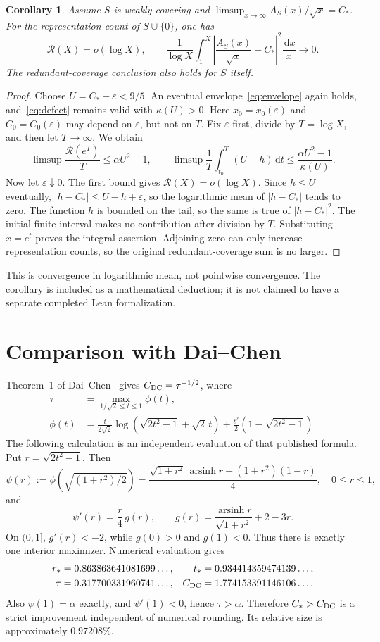 \documentclass[11pt]{article}
\newtheorem{corollary}[theorem]{Corollary}
\theoremstyle{definition}\newtheorem{definition}[theorem]{Definition}
\theoremstyle{remark}\newtheorem{remark}[theorem]{Remark}
\numberwithin{equation}{section}
\newcommand{\al}{\alpha}
\newcommand{\Cs}{C_*}
\newcommand{\RR}{\mathcal R}
\newcommand{\dd}{\,\mathrm d}
\DeclareMathOperator{\arsinh}{arsinh}
\begin{document}
\begin{corollary}\label{cor:rigidity}
Assume $S$ is weakly covering and
$\limsup_{x\to\infty}A_S(x)/\sqrt x=\Cs$.
For the representation count of $S\cup\{0\}$, one has
\[
\RR(X)=o(\log X),
\qquad
\frac1{\log X}\int_1^X
\left|\frac{A_S(x)}{\sqrt x}-\Cs\right|^2\frac{\dd x}{x}\longrightarrow0.
\]
The redundant-coverage conclusion also holds for $S$ itself.
\end{corollary}
\begin{proof}
Choose $U=\Cs+\varepsilon<9/5$. An eventual envelope~\eqref{eq:envelope} again holds, and~\eqref{eq:defect} remains valid with $\kappa(U)>0$. Here $x_0=x_0(\varepsilon)$ and $C_0=C_0(\varepsilon)$ may depend on $\varepsilon$, but not on $T$. Fix $\varepsilon$ first, divide by $T=\log X$, and then let $T\to\infty$. We obtain
\[
\limsup\frac{\RR(e^T)}T\le\al U^2-1,
\qquad
\limsup\frac1T\int_{t_0}^T(U-h)\dd t
\le\frac{\al U^2-1}{\kappa(U)}.
\]
Now let $\varepsilon\downarrow0$. The first bound gives $\RR(X)=o(\log X)$. Since $h\le U$ eventually,
$|h-\Cs|\le U-h+\varepsilon$, so the logarithmic mean of $|h-\Cs|$ tends to zero. The function $h$ is bounded on the tail, so the same is true of $|h-\Cs|^2$. The initial finite interval makes no contribution after division by $T$. Substituting $x=e^t$ proves the integral assertion. Adjoining zero can only increase representation counts, so the original redundant-coverage sum is no larger.
\end{proof}
This is convergence in logarithmic mean, not pointwise convergence. The corollary is included as a mathematical deduction; it is not claimed to have a separate completed Lean formalization.

\section{Comparison with Dai--Chen}\label{sec:comparison}
Theorem~1 of Dai--Chen~\cite{DC} gives $C_{\rm DC}=\tau^{-1/2}$, where
\begin{align*}
\tau&=\max_{1/\sqrt2\le t\le1}\phi(t),\\
\phi(t)&=\frac{t}{2\sqrt2}\log\left(\sqrt{2t^2-1}+\sqrt2\,t\right)
 +\frac{t^2}{2}\left(1-\sqrt{2t^2-1}\right).
\end{align*}
The following calculation is an independent evaluation of that published formula. Put $r=\sqrt{2t^2-1}$. Then
\[
\psi(r):=\phi\left(\sqrt{(1+r^2)/2}\right)
=\frac{\sqrt{1+r^2}\,\arsinh r+(1+r^2)(1-r)}4,
\quad 0\le r\le1,
\]
and
\[
\psi'(r)=\frac r4\,g(r),\qquad
g(r)=\frac{\arsinh r}{\sqrt{1+r^2}}+2-3r.
\]
On $(0,1]$, $g'(r)<-2$, while $g(0)>0$ and $g(1)<0$. Thus there is exactly one interior maximizer. Numerical evaluation gives
\begin{align*}
r_*&=0.863863641081699\ldots,&t_*&=0.934414359474139\ldots,\\
\tau&=0.317700331960741\ldots,&C_{\rm DC}&=1.774153391146106\ldots.
\end{align*}
Also $\psi(1)=\al$ exactly, and $\psi'(1)<0$, hence $\tau>\al$. Therefore $\Cs>C_{\rm DC}$ is a strict improvement independent of numerical rounding. Its relative size is approximately $0.97208\%$.
\end{document}
